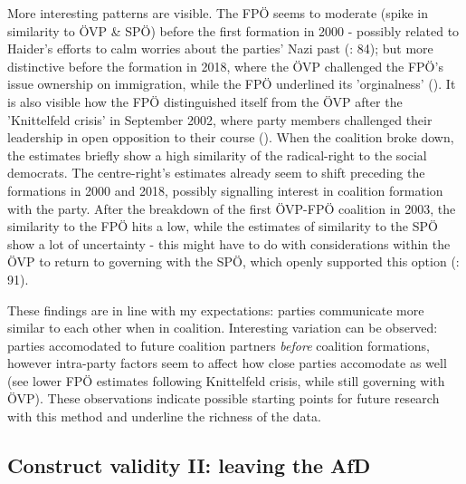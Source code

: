\documentclass{article}
\begin{document}
More interesting patterns are visible. The FPÖ seems to moderate (spike in similarity to ÖVP \& SPÖ) before the first formation in 2000 - possibly related to Haider's efforts to calm worries about the parties' Nazi past (\cite{Luther2010}: 84); but more distinctive before the formation in 2018, where the ÖVP challenged the FPÖ's issue ownership on immigration, while the FPÖ underlined its 'orginalness' (\cite{Bodlos2018}). It is also visible how the FPÖ distinguished itself from the ÖVP after the 'Knittelfeld crisis' in September 2002, where party members challenged their leadership in open opposition to their course (\cite{Luther2002}). When the coalition broke down, the estimates briefly show a high similarity of the radical-right to the social democrats. The centre-right's estimates already seem to shift preceding the formations in 2000 and 2018, possibly signalling interest in coalition formation with the party. After the breakdown of the first ÖVP-FPÖ coalition in 2003, the similarity to the FPÖ hits a low, while the estimates of similarity to the SPÖ show a lot of uncertainty - this might have to do with considerations within the ÖVP to return to governing with the SPÖ, which openly supported this option (\cite{Luther2010}: 91). \par


These findings are in line with my expectations: parties communicate more similar to each other when in coalition. Interesting variation can be observed: parties accomodated to future coalition partners \textit{before} coalition formations, however intra-party factors seem to affect how close parties accomodate as well (see lower FPÖ estimates following Knittelfeld crisis, while still governing with ÖVP). These observations indicate possible starting points for future research with this method and underline the richness of the data.\par



\subsection{Construct validity II: leaving the AfD}
\end{document}
